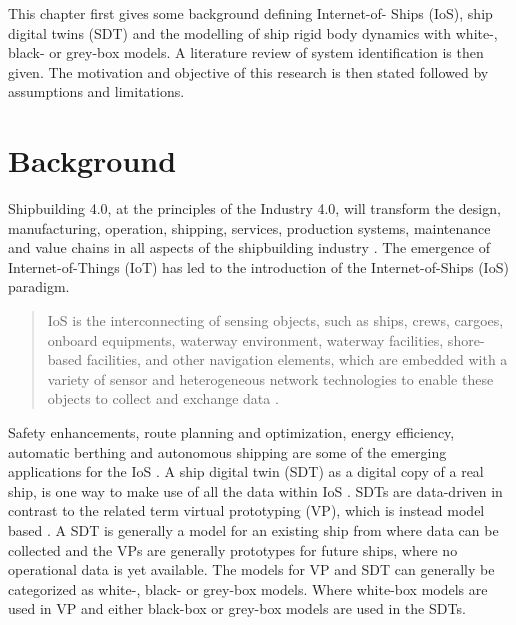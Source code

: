 This chapter first gives some background defining Internet-of-
Ships (IoS), ship digital twins (SDT) and the modelling of ship rigid body dynamics with white-, black- or grey-box models. A literature review of system identification is then given.
The motivation and objective of this research is then stated followed by assumptions and limitations.

\section{Background}
Shipbuilding 4.0, at the principles of the Industry 4.0, will transform the design, manufacturing, operation, shipping, services, production systems, maintenance and value chains in all aspects of the shipbuilding 
industry \cite{stanic_toward_2018}.
The emergence of Internet-of-Things (IoT) has led to the introduction of the Internet-of-Ships (IoS) paradigm. \begin{quote} IoS is the interconnecting of sensing objects, such as ships, crews, cargoes, onboard equipments, waterway environment, waterway facilities, shore-based facilities, and other navigation elements, which are embedded with a variety of sensor and heterogeneous network technologies to enable these objects to collect and exchange data \cite{liu_internet_2016-1}.\end{quote}
Safety enhancements, route planning and optimization, energy efficiency, automatic berthing and autonomous shipping are some of the emerging applications for the IoS \cite{aslam_internet_2020}.
A ship digital twin (SDT) as a digital copy of a real ship, is one way to make use of all the data within IoS \cite{chen_review_2021}. 
SDTs are data-driven in contrast to the related term virtual prototyping (VP), which is instead model based \cite{major_framework_2021}. A SDT is generally a model for an existing ship from where data can be collected and the VPs are generally prototypes for future ships, where no operational data is yet available.
The models for VP and SDT can generally be categorized as white-, black- or grey-box models. Where 
white-box models are used in VP and either black-box or grey-box models are used in the SDTs. 
